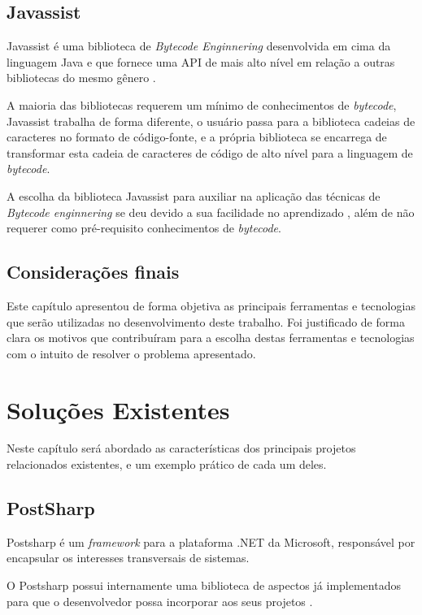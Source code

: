 \documentclass[tc,oneside]{iiufrgs}
\begin{document}
\section{Javassist}

Javassist é uma biblioteca de \textit{Bytecode Enginnering} desenvolvida em cima da linguagem Java e que fornece uma API de mais alto nível em relação a outras bibliotecas do mesmo gênero \cite{javassist}.

A maioria das bibliotecas requerem um mínimo de conhecimentos de \textit{bytecode}, Javassist trabalha de forma diferente, o usuário passa para a biblioteca cadeias de caracteres no formato de código-fonte, e a própria biblioteca se encarrega de transformar esta cadeia de caracteres de código de alto nível para a linguagem de \textit{bytecode}.

A escolha da biblioteca Javassist para auxiliar na aplicação das técnicas de \textit{Bytecode enginnering} se deu devido a sua facilidade no aprendizado , além de não requerer como pré-requisito conhecimentos de \textit{bytecode}.

\section{Considerações finais}

Este capítulo apresentou de forma objetiva as principais ferramentas e tecnologias que serão utilizadas no desenvolvimento deste trabalho. Foi justificado de forma clara os motivos que contribuíram para a escolha destas ferramentas e tecnologias com o intuito de resolver o problema apresentado.

\chapter{Soluções Existentes}
Neste capítulo será abordado as características dos principais projetos relacionados existentes, e um exemplo prático de cada um deles.

\section{PostSharp}

Postsharp é um \textit{framework} para a plataforma .NET da Microsoft, responsável por encapsular os interesses transversais de sistemas.

O Postsharp possui internamente uma biblioteca de aspectos já implementados para que o desenvolvedor possa incorporar aos seus projetos  \cite{groves2013aop}.
\end{document}
